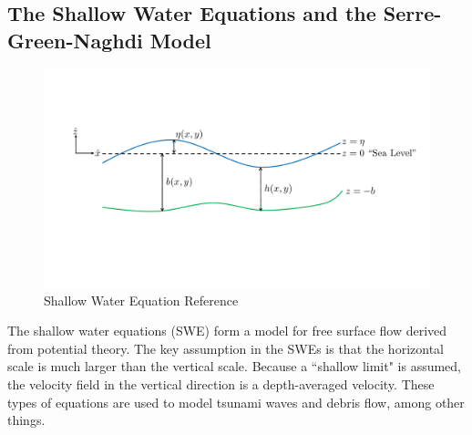 \subsection{The Shallow Water Equations and the Serre-Green-Naghdi Model}

\begin{figure}
    \centering
    \includegraphics[width=\columnwidth]{figures/swe_model.pdf}
    \caption{Shallow Water Equation Reference}
    \label{fig:swe}
\end{figure}

The shallow water equations (SWE) form a model for free surface flow derived from potential theory. The key assumption in the SWEs is that the horizontal scale is much larger than the vertical scale. Because a ``shallow limit" is assumed, the velocity field in the vertical direction is a depth-averaged velocity. These types of equations are used to model tsunami waves and debris flow, among other things.

